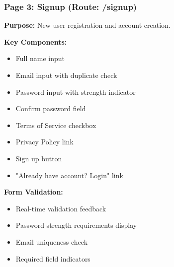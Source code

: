 \documentclass[12pt,a4paper]{article}
\begin{document}
\vspace{0.5cm}
\noindent{}
\vspace{1cm}


\subsubsection*{Page 3: Signup (Route: /signup)}

\textbf{Purpose:} New user registration and account creation.

\textbf{Key Components:}
\begin{itemize}[noitemsep, topsep=2pt]
  \item Full name input
  \item Email input with duplicate check
  \item Password input with strength indicator
  \item Confirm password field
  \item Terms of Service checkbox
  \item Privacy Policy link
  \item Sign up button
  \item "Already have account? Login" link
\end{itemize}

\textbf{Form Validation:}
\begin{itemize}[noitemsep, topsep=2pt]
  \item Real-time validation feedback
  \item Password strength requirements display
  \item Email uniqueness check
  \item Required field indicators
\end{itemize}

\vspace{0.5cm}
\noindent{}
\vspace{1cm}

\end{document}
